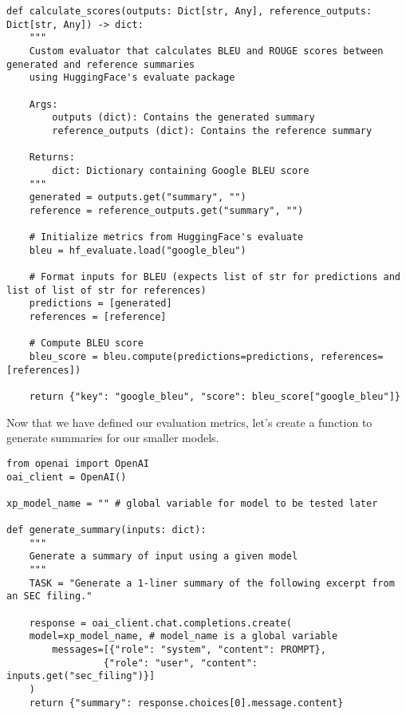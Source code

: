 \begin{verbatim}
def calculate_scores(outputs: Dict[str, Any], reference_outputs: Dict[str, Any]) -> dict:
    """
    Custom evaluator that calculates BLEU and ROUGE scores between generated and reference summaries
    using HuggingFace's evaluate package
    
    Args:
        outputs (dict): Contains the generated summary
        reference_outputs (dict): Contains the reference summary
    
    Returns:
        dict: Dictionary containing Google BLEU score
    """
    generated = outputs.get("summary", "")
    reference = reference_outputs.get("summary", "")
    
    # Initialize metrics from HuggingFace's evaluate
    bleu = hf_evaluate.load("google_bleu")
    
    # Format inputs for BLEU (expects list of str for predictions and list of list of str for references)
    predictions = [generated]
    references = [reference]
    
    # Compute BLEU score
    bleu_score = bleu.compute(predictions=predictions, references=[references])
    
    return {"key": "google_bleu", "score": bleu_score["google_bleu"]}
\end{verbatim}
Now that we have defined our evaluation metrics, let's create a function to generate summaries for our smaller models.~

\begin{verbatim}
from openai import OpenAI
oai_client = OpenAI()

xp_model_name = "" # global variable for model to be tested later

def generate_summary(inputs: dict):
    """
    Generate a summary of input using a given model
    """
    TASK = "Generate a 1-liner summary of the following excerpt from an SEC filing."
    
    response = oai_client.chat.completions.create(
    model=xp_model_name, # model_name is a global variable
        messages=[{"role": "system", "content": PROMPT},
                 {"role": "user", "content": inputs.get("sec_filing")}]
    )
    return {"summary": response.choices[0].message.content}
\end{verbatim}

